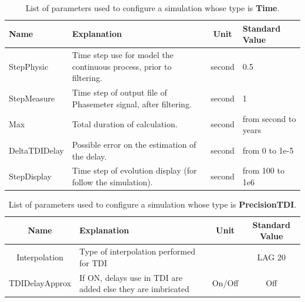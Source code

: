 \documentclass[a4paper,english,12pt]{article}
\begin{document}
\begin{table}[p]
\caption{List of parameters used to configure a simulation whose type is \textbf{Time}. }
\begin{center} 
\begin{tabular}{|p{}|p{}|c|p{}|} 
\hline 
Name & Explanation & Unit & Standard Value  \\ 
\hline 
 StepPhysic & Time step use for model the continuous process, prior to filtering. & second & 0.5 \\ 
\hline 
 StepMeasure & Time step of output file of Phasemeter signal, after filtering. & second & 1 \\ 
\hline 
 Max & Total duration of calculation. & second & from second to years \\ 
\hline 
 DeltaTDIDelay & Possible error on the estimation of the delay. & second & from 0 to 1e-5 \\ 
\hline 
 StepDisplay & Time step of evolution display (for follow the simulation). & second & from 100 to 1e6 \\ 
\hline 
\end{tabular} 
\end{center} 
\label{table_paramTime} 
\end{table}

\begin{table}[p]
\caption{List of parameters used to configure a simulation whose type is \textbf{PrecisionTDI}. }
\begin{center} 
\begin{tabular}{|c|p{}|c|c|} 
\hline 
Name & Explanation & Unit & Standard Value  \\ 
\hline
 Interpolation & Type of interpolation performed for TDI &  & LAG 20 \\ 
\hline 
 TDIDelayApprox & If ON, delays use in TDI are added else they are imbricated  & On/Off & Off \\ 
 \hline
\end{tabular} 
\end{center} 
\label{table_paramPrecisionTDI} 
\end{table}
\end{document}
